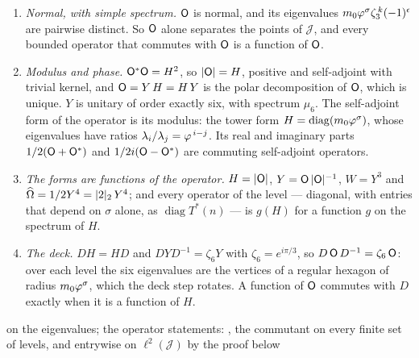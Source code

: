 \begin{theorem}\label{thm:one-operator}
\begin{enumerate}[label=\textup{(\roman*)}]
  \item \emph{Normal, with simple spectrum.}  $\mathsf{O}$ is normal, and its eigenvalues
    $m_0\varphi^{\sigma}\zeta_3^{\,k}(-1)^{\epsilon}$ are pairwise distinct.  So $\mathsf{O}$ alone separates the points
    of $\mathcal J$, and every bounded operator that commutes with $\mathsf{O}$ is a function of $\mathsf{O}$.
  \item \emph{Modulus and phase.}  $\mathsf{O}^{*}\mathsf{O}=H^2$, so $|\mathsf{O}|=H$, positive and self-adjoint with trivial
    kernel, and $\mathsf{O}=Y\,H=H\,Y$ is the polar decomposition of $\mathsf{O}$, which is unique.  $Y$ is unitary of order
    exactly six, with spectrum $\mu_6$.  The self-adjoint form of the operator is its modulus: the tower form
    $H=\operatorname{diag}(m_0\varphi^{\sigma})$, whose eigenvalues have ratios
    $\lambda_i/\lambda_j=\varphi^{\,i-j}$.  Its real and imaginary parts
    $1/2(\mathsf{O}+\mathsf{O}^{*})$ and $1/2i(\mathsf{O}-\mathsf{O}^{*})$ are commuting self-adjoint operators.
  \item \emph{The forms are functions of the operator.}  $H=|\mathsf{O}|$, $Y=\mathsf{O}\,|\mathsf{O}|^{-1}$, $W=Y^3$ and
    $\widehat{\Omega}=1/2Y^4=|2|_2\,Y^4$; and every operator of the level --- diagonal, with entries that depend on $\sigma$
    alone, as $\operatorname{diag}T^*(n)$ --- is $g(H)$ for a function $g$ on the spectrum of $H$.
  \item \emph{The deck.}  $DH=HD$ and $DYD^{-1}=\zeta_6Y$ with $\zeta_6=e^{i\pi/3}$, so
    $D\,\mathsf{O}\,D^{-1}=\zeta_6\,\mathsf{O}$: over each level the six eigenvalues are the vertices of a regular hexagon of
    radius $m_0\varphi^{\sigma}$, which the deck step rotates.  A function of $\mathsf{O}$ commutes with $D$ exactly when
    it is a function of $H$.
\end{enumerate}


on the eigenvalues; the
operator statements: ,
the commutant on every finite set of levels, and entrywise on $\ell^2(\mathcal J)$ by the proof below
\end{theorem}

